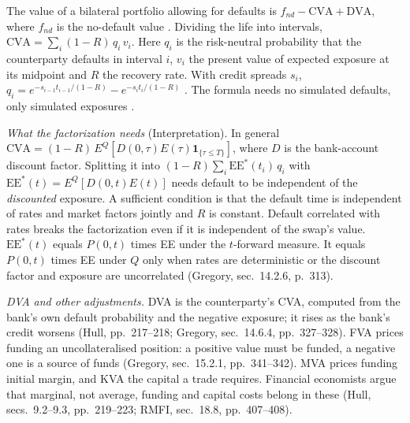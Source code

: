 \begin{qfmethod}\label{meth:credit-valuation-adjustment}
 The value of a bilateral portfolio allowing for defaults is $f_{nd}-\mathrm{CVA}+\mathrm{DVA}$, where $f_{nd}$ is the no-default value \citep[chap.~9, sec.~9.1, pp.~216--218]{s7-hulloptions}. Dividing the life into intervals, $\mathrm{CVA}=\sum_i(1-R)\,q_i\,v_i$. Here $q_i$ is the risk-neutral probability that the counterparty defaults in interval $i$, $v_i$ the present value of expected exposure at its midpoint and $R$ the recovery rate. With credit spreads $s_i$, $q_i=e^{-s_{i-1}t_{i-1}/(1-R)}-e^{-s_it_i/(1-R)}$ \citep[chap.~18, sec.~18.2, pp.~395--396, eqs.~(18.1)--(18.3)]{risk-management-financial-institutions-2023}. The formula needs no simulated defaults, only simulated exposures \citep[chap.~14, sec.~14.2.3, p.~311]{gregory-xva-challenge-2015}.

\emph{What the factorization needs} (Interpretation). In general $\mathrm{CVA}=(1-R)\,E^Q[D(0,\tau)E(\tau)\mathbf 1_{\{\tau\le T\}}]$, where $D$ is the bank-account discount factor. Splitting it into $(1-R)\sum_i\mathrm{EE}^*(t_i)\,q_i$ with $\mathrm{EE}^*(t)=E^Q[D(0,t)E(t)]$ needs default to be independent of the \emph{discounted} exposure. A sufficient condition is that the default time is independent of rates and market factors jointly and $R$ is constant. Default correlated with rates breaks the factorization even if it is independent of the swap's value. $\mathrm{EE}^*(t)$ equals $P(0,t)$ times EE under the $t$-forward measure. It equals $P(0,t)$ times EE under $Q$ only when rates are deterministic or the discount factor and exposure are uncorrelated (Gregory, sec.~14.2.6, p.~313).

\emph{DVA and other adjustments.} DVA is the counterparty's CVA, computed from the bank's own default probability and the negative exposure; it rises as the bank's credit worsens (Hull, pp.~217--218; Gregory, sec.~14.6.4, pp.~327--328). FVA prices funding an uncollateralised position: a positive value must be funded, a negative one is a source of funds (Gregory, sec.~15.2.1, pp.~341--342). MVA prices funding initial margin, and KVA the capital a trade requires. Financial economists argue that marginal, not average, funding and capital costs belong in these (Hull, secs.~9.2--9.3, pp.~219--223; RMFI, sec.~18.8, pp.~407--408).


\end{qfmethod}
